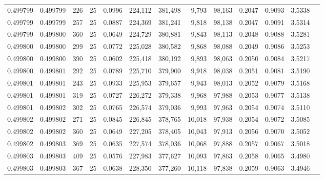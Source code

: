 \begin{tabular}{rrrrrrrrrrrrr}
0.499799 & 0.499799 &   226 &  25 &                                     0.0996 & 224,112 & 381,498 &   9,793 &  98,163 & 0.2047 & 0.9093 & 3.5338 \\
0.499799 & 0.499799 &   257 &  25 &                                     0.0887 & 224,369 & 381,241 &   9,818 &  98,138 & 0.2047 & 0.9091 & 3.5314 \\
0.499799 & 0.499800 &   360 &  25 &                                     0.0649 & 224,729 & 380,881 &   9,843 &  98,113 & 0.2048 & 0.9088 & 3.5281 \\
0.499800 & 0.499800 &   299 &  25 &                                     0.0772 & 225,028 & 380,582 &   9,868 &  98,088 & 0.2049 & 0.9086 & 3.5253 \\
0.499800 & 0.499800 &   390 &  25 &                                     0.0602 & 225,418 & 380,192 &   9,893 &  98,063 & 0.2050 & 0.9084 & 3.5217 \\
0.499800 & 0.499801 &   292 &  25 &                                     0.0789 & 225,710 & 379,900 &   9,918 &  98,038 & 0.2051 & 0.9081 & 3.5190 \\
0.499801 & 0.499801 &   243 &  25 &                                     0.0933 & 225,953 & 379,657 &   9,943 &  98,013 & 0.2052 & 0.9079 & 3.5168 \\
0.499801 & 0.499801 &   319 &  25 &                                     0.0727 & 226,272 & 379,338 &   9,968 &  97,988 & 0.2053 & 0.9077 & 3.5138 \\
0.499801 & 0.499802 &   302 &  25 &                                     0.0765 & 226,574 & 379,036 &   9,993 &  97,963 & 0.2054 & 0.9074 & 3.5110 \\
0.499802 & 0.499802 &   271 &  25 &                                     0.0845 & 226,845 & 378,765 &  10,018 &  97,938 & 0.2054 & 0.9072 & 3.5085 \\
0.499802 & 0.499802 &   360 &  25 &                                     0.0649 & 227,205 & 378,405 &  10,043 &  97,913 & 0.2056 & 0.9070 & 3.5052 \\
0.499802 & 0.499803 &   369 &  25 &                                     0.0635 & 227,574 & 378,036 &  10,068 &  97,888 & 0.2057 & 0.9067 & 3.5018 \\
0.499803 & 0.499803 &   409 &  25 &                                     0.0576 & 227,983 & 377,627 &  10,093 &  97,863 & 0.2058 & 0.9065 & 3.4980 \\
0.499803 & 0.499803 &   367 &  25 &                                     0.0638 & 228,350 & 377,260 &  10,118 &  97,838 & 0.2059 & 0.9063 & 3.4946 \\

\end{tabular}
